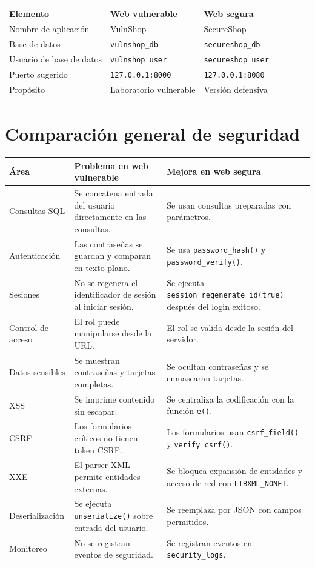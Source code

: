 \documentclass[12pt,a4paper]{article}
\begin{document}
\begin{longtable}{|p{4cm}|p{5cm}|p{5cm}|}
\hline
\textbf{Elemento} & \textbf{Web vulnerable} & \textbf{Web segura} \\
\hline
Nombre de aplicación & VulnShop & SecureShop \\
\hline
Base de datos & \texttt{vulnshop\_db} & \texttt{secureshop\_db} \\
\hline
Usuario de base de datos & \texttt{vulnshop\_user} & \texttt{secureshop\_user} \\
\hline
Puerto sugerido & \texttt{127.0.0.1:8000} & \texttt{127.0.0.1:8080} \\
\hline
Propósito & Laboratorio vulnerable & Versión defensiva \\
\hline
\end{longtable}

\section{Comparación general de seguridad}

\begin{longtable}{|p{3.5cm}|p{5cm}|p{5cm}|}
\hline
\textbf{Área} & \textbf{Problema en web vulnerable} & \textbf{Mejora en web segura} \\
\hline
Consultas SQL & Se concatena entrada del usuario directamente en las consultas. & Se usan consultas preparadas con parámetros. \\
\hline
Autenticación & Las contraseñas se guardan y comparan en texto plano. & Se usa \texttt{password\_hash()} y \texttt{password\_verify()}. \\
\hline
Sesiones & No se regenera el identificador de sesión al iniciar sesión. & Se ejecuta \texttt{session\_regenerate\_id(true)} después del login exitoso. \\
\hline
Control de acceso & El rol puede manipularse desde la URL. & El rol se valida desde la sesión del servidor. \\
\hline
Datos sensibles & Se muestran contraseñas y tarjetas completas. & Se ocultan contraseñas y se enmascaran tarjetas. \\
\hline
XSS & Se imprime contenido sin escapar. & Se centraliza la codificación con la función \texttt{e()}. \\
\hline
CSRF & Los formularios críticos no tienen token CSRF. & Los formularios usan \texttt{csrf\_field()} y \texttt{verify\_csrf()}. \\
\hline
XXE & El parser XML permite entidades externas. & Se bloquea expansión de entidades y acceso de red con \texttt{LIBXML\_NONET}. \\
\hline
Deserialización & Se ejecuta \texttt{unserialize()} sobre entrada del usuario. & Se reemplaza por JSON con campos permitidos. \\
\hline
Monitoreo & No se registran eventos de seguridad. & Se registran eventos en \texttt{security\_logs}. \\
\hline
\end{longtable}
\end{document}
